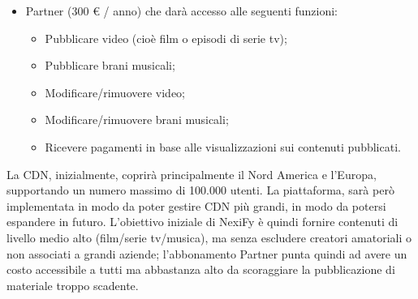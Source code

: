 \begin{itemize}
	\item Partner (300 € / anno) che darà accesso alle seguenti funzioni:
	\begin{itemize}
   		\item Pubblicare video (cioè film o episodi di serie tv);
		\item Pubblicare brani musicali;
		\item Modificare/rimuovere video;
		\item Modificare/rimuovere brani musicali;
		\item Ricevere pagamenti in base alle visualizzazioni sui contenuti pubblicati.
	\end{itemize}
\end{itemize}


La CDN, inizialmente, coprirà principalmente il Nord America e l'Europa, supportando un numero massimo di 100.000 utenti. La piattaforma, sarà però implementata in modo da poter gestire CDN più grandi, in modo da potersi espandere in futuro. L'obiettivo iniziale di NexiFy è quindi fornire contenuti di livello medio alto (film/serie tv/musica), ma senza escludere creatori amatoriali o non associati a grandi aziende; l'abbonamento Partner punta quindi ad avere un costo accessibile a tutti ma abbastanza alto da scoraggiare la pubblicazione di materiale troppo scadente.
